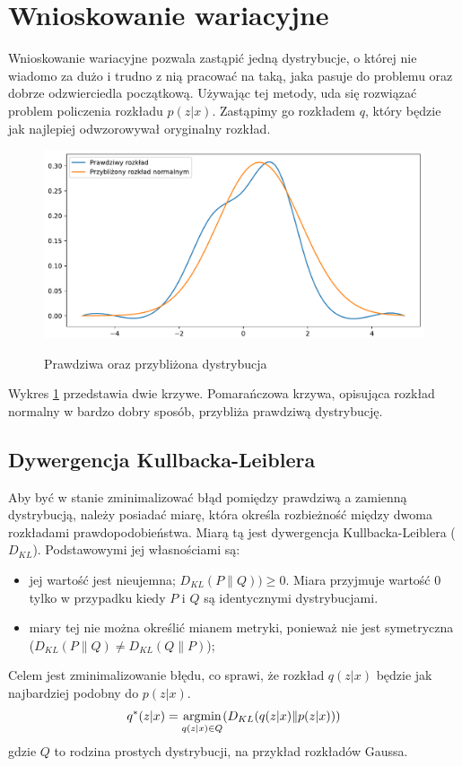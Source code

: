 \documentclass[a4paper,12pt,oneside]{book} %
\begin{document}
\section{Wnioskowanie wariacyjne}
Wnioskowanie wariacyjne pozwala zastąpić jedną dystrybucje, o której nie wiadomo za dużo i trudno z nią pracować na taką, jaka pasuje do problemu oraz dobrze odzwierciedla początkową. Używając tej metody, uda się rozwiązać problem policzenia rozkładu $p(z|x)$. Zastąpimy go rozkładem $q$, który będzie jak najlepiej odwzorowywał oryginalny rozkład. 
\begin{figure}[h!]
	\centering
	\includegraphics[width=12cm]{approximate.pdf}
	\label{fig:approximate}
	\caption{Prawdziwa oraz przybliżona dystrybucja}
\end{figure} 

Wykres \ref{fig:approximate} przedstawia dwie krzywe. Pomarańczowa krzywa, opisująca rozkład normalny w bardzo dobry sposób, przybliża prawdziwą dystrybucję.
\subsection{Dywergencja Kullbacka-Leiblera}
Aby być w stanie zminimalizować błąd pomiędzy prawdziwą a zamienną dystrybucją, należy posiadać miarę, która określa rozbieżność między dwoma rozkładami prawdopodobieństwa. Miarą tą jest dywergencja Kullbacka-Leiblera ($D_{KL}$). Podstawowymi jej własnościami są:
\begin{itemize}
	\item jej wartość jest nieujemna; $D_{KL}(P\|Q)) \geq 0$. Miara przyjmuje wartość 0 tylko w przypadku kiedy $P$ i $Q$ są identycznymi dystrybucjami.
	\item miary tej nie można określić mianem metryki, ponieważ nie jest symetryczna ($D_{KL}(P\|Q)\neq D_{KL}(Q\|P)$);
\end{itemize}
Celem jest zminimalizowanie błędu, co sprawi, że rozkład $q(z|x)$ będzie jak najbardziej podobny do $p(z|x)$.
\begin{equation}
	q^\ast(z|x)=\operatorname*{argmin}_{q(z|x)\in Q}(D_{KL}(q(z|x)\|p(z|x)))\\
		\label{qopt}
\end{equation}
gdzie $Q$ to rodzina prostych dystrybucji, na przykład rozkładów Gaussa.
\end{document}
